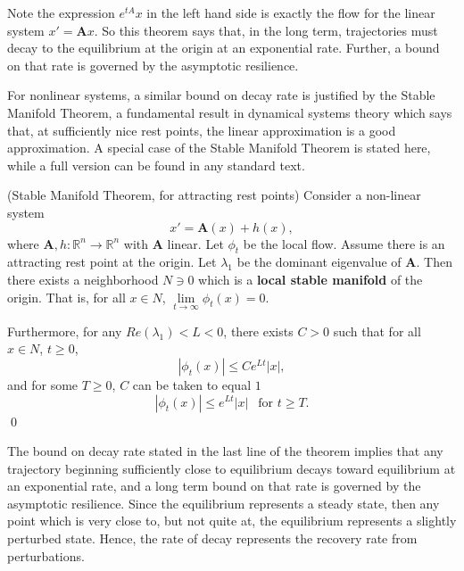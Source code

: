 Note the expression $e^{tA}x$ in the left hand side is exactly the flow for the linear system $x' = \mathbf{A}x$. So this theorem says that, in the long term, trajectories must decay to the equilibrium at the origin at an exponential rate. Further, a bound on that rate is governed by the asymptotic resilience. 

For nonlinear systems, a similar bound on decay rate is justified by the Stable Manifold Theorem, a fundamental result in dynamical systems theory which says that, at sufficiently nice rest points, the linear approximation is a good approximation. %
%
%
%
A special case of the Stable Manifold Theorem is stated here, while a full version can be found in any standard text. %

\begin{theorem}(Stable Manifold Theorem, for attracting rest points)
	Consider a non-linear system 
	$$x' = \mathbf{A}(x) + h(x),$$ 
	where $\mathbf{A}, h: \mathbb{R}^n \to \mathbb{R}^n$ with $\mathbf{A}$ linear.  Let $\phi_t$ be the local flow.
	Assume there is an attracting rest point at the origin. 
	Let $\lambda_1$ be the dominant eigenvalue of $\mathbf{A}$. Then there exists a neighborhood $N \ni 0$ which is a \textbf{local stable manifold} of the origin. 
	That is, for all $x \in N$, $\lim\limits_{t \to \infty} \phi_t(x)= 0$.
	
	Furthermore, for any $Re(\lambda_1) < L < 0$, there exists $C >0$ such that for all $x \in N$, $t \geq 0$,
	$$|\phi_t(x)| \leq Ce^{Lt}|x|,$$
 	and for some $T \geq 0$, $C$ can be taken to equal $1$
	$$|\phi_t(x)| \leq e^{L t}|x| ~ ~\text{ for } t \geq T.$$
	 \qed
\end{theorem}

The bound on decay rate stated in the last line of the theorem implies that any trajectory beginning sufficiently close to equilibrium decays toward equilibrium at an exponential rate, and a long term bound on that rate is governed by the asymptotic resilience. Since the equilibrium represents a steady state, then any point which is very close to, but not quite at, the equilibrium represents a slightly perturbed state. Hence, the rate of decay represents the recovery rate from perturbations. 


